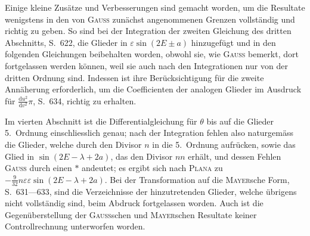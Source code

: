 \par\noindent\hspace*{\parindent}Einige kleine Zusätze und Verbesserungen sind gemacht worden, um die Resultate wenigstens in den
von \textsc{Gauss} zunächst angenommenen Grenzen vollständig und richtig zu geben. So sind bei der Integration
der zweiten Gleichung des dritten Abschnitts, S.~622, die Glieder in \(\varepsilon\sin(2E\pm a)\) hinzugefügt und in
den folgenden Gleichungen beibehalten worden, obwohl sie, wie \textsc{Gauss} bemerkt, dort fortgelassen werden
können, weil sie auch nach den Integrationen nur von der dritten Ordnung sind. Indessen ist ihre Berücksichtigung
für die zweite Annäherung erforderlich, um die Coefficienten der analogen Glieder im Ausdruck
für \(\frac{\mathrm du^2}{\mathrm dv^2}\pi\), S.~634, richtig zu erhalten.

\par\noindent\hspace*{\parindent}Im vierten Abschnitt ist die Differentialgleichung für \(\theta\) bis auf die Glieder 5.~Ordnung einschliesslich
genau; nach der Integration fehlen also naturgemäss die Glieder, welche durch den Divisor \(n\) in die
5.~Ordnung aufrücken, sowie das Glied in \(\sin(2E-\lambda+2a)\), das den Divisor \(nn\) erhält, und dessen
Fehlen \textsc{Gauss} durch einen \(*\) andeutet; es ergibt sich nach \textsc{Plana} zu \(-\frac{9}{32}n\varepsilon\varepsilon\sin(2E-\lambda+2a)\).
Bei der Transformation auf die \textsc{Mayer}sche Form, S.~631---633, sind die Verzeichnisse der hinzutretenden Glieder,
welche übrigens nicht vollständig sind, beim Abdruck fortgelassen worden. Auch ist die Gegenüberstellung
der \textsc{Gauss}schen und \textsc{Mayer}schen Resultate keiner Controllrechnung unterworfen worden.

